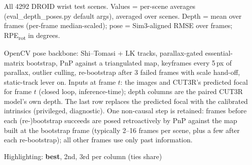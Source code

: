\documentclass[11pt,border=8pt]{standalone}
\begin{document}
%
\begin{minipage}{\wd\tblbox}
\usebox{\tblbox}\par\vspace{2pt}
{\footnotesize All 4292 DROID wrist test scenes. Values = per-scene averages (eval\_depth\_poses.py default args), averaged over scenes. Depth = mean over frames (per-frame median-scaled); pose = Sim3-aligned RMSE over frames; RPE\textsubscript{rot} in degrees.\par}
{\footnotesize OpenCV pose backbone: Shi--Tomasi + LK tracks, parallax-gated essential-matrix bootstrap, PnP against a triangulated map, keyframes every 5\,px of parallax, outlier culling, re-bootstrap after 3 failed frames with scale hand-off, static-track lever on. Inputs at frame $t$: the images and CUT3R's predicted focal for frame $t$ (closed loop, inference-time); depth columns are the paired CUT3R model's own depth. The last row replaces the predicted focal with the calibrated intrinsics (privileged, diagnostic). One non-causal step is retained: frames before each (re-)bootstrap succeeds are posed retroactively by PnP against the map built at the bootstrap frame (typically 2--16 frames per scene, plus a few after each re-bootstrap); all other frames use only past information.\par}
{\footnotesize Highlighting: \colorbox{red!30}{\textbf{best}}, \colorbox{orange!30}{2nd}, \colorbox{yellow!40}{3rd} per column (ties share)\par}
\end{minipage}
\end{document}
